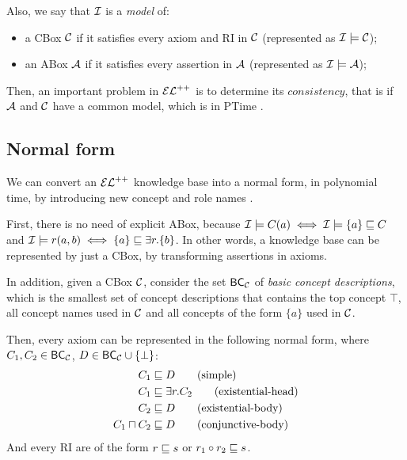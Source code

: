 Also, we say that $\mathcal{I}$ is a \emph{model} of:
\begin{itemize}
	\item a CBox $\mathcal{C}$ if it satisfies every axiom and RI in $\mathcal{C}$ (represented as $\mathcal{I} \models \mathcal{C}$);
	\item an ABox $\mathcal{A}$ if it satisfies every assertion in $\mathcal{A}$ (represented as $\mathcal{I} \models \mathcal{A}$);
\end{itemize}

Then, an important problem in $\mathcal{EL}^{++}$ is to determine its $consistency$, that is if $\mathcal{A}$ and $\mathcal{C}$ have a common model, which is in PTime \citep{Baader2005a}.

\subsection{Normal form}
We can convert an $\mathcal{EL}^{++}$ knowledge base into a normal form, in polynomial time, by introducing new concept and role names \citep{Baader2005a}.

First, there is no need of explicit ABox, because $\mathcal{I} \models C(a)\iff \mathcal{I} \models \{a\} \sqsubseteq C$ and $\mathcal{I} \models r(a, b) \iff \{a\} \sqsubseteq \exists r.\{b\}$. In other words, a knowledge base can be represented by just a CBox, by transforming assertions in axioms.

In addition, given a CBox $\mathcal{C}$, consider the set $\mathsf{BC}_\mathcal{C}$ of \emph{basic concept descriptions}, which is the smallest set of concept descriptions that contains the top concept $\top$, all concept names used in $\mathcal{C}$ and all concepts of the form $\{a\}$ used in $\mathcal{C}$.

Then, every axiom can be represented in the following normal form, where $C_1, C_2 \in \mathsf{BC}_\mathcal{C}$, $D \in \mathsf{BC}_\mathcal{C} \cup \{\bot\}$:
\begin{align*}
	C_1            & \sqsubseteq D             \tag{simple}           \\
	C_1            & \sqsubseteq \exists r.C_2 \tag{existential-head} \\
	C_2            & \sqsubseteq D             \tag{existential-body} \\
	C_1 \sqcap C_2 & \sqsubseteq D  \tag{conjunctive-body}
\end{align*}
And every RI are of the form $r \sqsubseteq s$ or $r_1 \circ r_2 \sqsubseteq s$.

